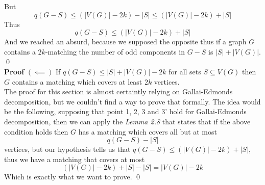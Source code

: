 But
\begin{equation*}
    q(G - S) \leq (|V(G)| - 2k) - |S| \leq (|V(G)| - 2k) + |S|
\end{equation*}
Thus
\begin{equation*}
    q(G - S) \leq (|V(G)| - 2k) + |S|
\end{equation*}
And we reached an absurd, because we supposed the opposite thus if a graph $G$ contains a $2k$-matching the number of odd components in $G - S$ is $|S| + |V(G)|$. \qed\\
\linebreak
\boldmath
\textbf{Proof} $(\impliedby)$ \unboldmath If $q(G - S) \leq |S| + |V(G)| - 2k$ for all sets $S \subseteq V(G)$ then $G$ contains a matching which covers at least $2k$ vertices. \\
\linebreak
The proof for this section is almost certaintly relying on Gallai-Edmonds decomposition, but we couldn't find a way to prove that formally.
The idea would be the following, supposing that point 1, 2, 3 and 3' hold for Gallai-Edmonds decomposition, then we can apply the \textit{Lemma 2.8} that states that if the above condition holds then $G$ has a matching which covers all but at most
\begin{equation*}
    q(G - S) - |S|
\end{equation*}
vertices, but our hypothesis tells us that $q(G - S) \leq (|V(G)| - 2k) + |S|$, thus we have a matching that covers at most
\begin{equation}
    (|V(G)| - 2k) + |S| - |S| = |V(G)| - 2k
\end{equation}
Which is exactly what we want to prove. \qed
